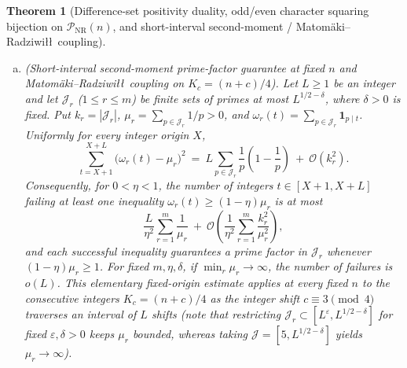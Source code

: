\documentclass[11pt, a4paper]{article}
\theoremstyle{plain}
\newtheorem{theorem}{Theorem}[section]
\theoremstyle{definition}
\begin{document}
\begin{theorem}[Difference-set positivity duality, odd/even character squaring bijection on $\mathcal{P}_{\mathrm{NR}}(n)$, and short-interval second-moment / Matom\"{a}ki--Radziwi\l\l\ coupling]
\begin{enumerate}[(a)]
\begin{equation}
\begin{split}
    \big|\widehat{\mu}_p(\psi^{2})\big|^{2}\ &=\ \prod_{q\mid K_p}\cos^{2}\!\big(\arg\psi(q)\big).
    \end{split}
    \end{equation}
    In particular, every Bohr-localized odd character $\chi\in\widehat{G}_p^{-}\setminus\{\psi_0\}$ in the extremal polarization cone $\chi(q)=e^{i\delta_q}$ ($|\delta_q|\ll k^{-1/2}$, $x_q(\chi)=1-\frac14\delta_q^{2}+\mathcal{O}(\delta_q^{4})$) maps bijectively under $\chi\mapsto\chi^{2}$ to an even character $\chi^{2}\in\widehat{G}_p^{+}\setminus\{\chi_0\}$ satisfying as $\max_{q\mid K_p}|\delta_q|\to 0$ the asymptotic \emph{Quartic Dilation Law}
    \begin{equation}\label{eq:quartic_dilation_law}
    \big|\widehat{\mu}_p(\chi^{2})\big|^{2}\ =\ \prod_{q\mid K_p}\big(2x_q(\chi)-1\big)^{2}\ =\ \exp\!\left(-\sum_{q\mid K_p}\delta_q^{2}+\mathcal{O}\Big(\sum_{q\mid K_p}\delta_q^{4}\Big)\right)\ =\ \Big(\big|\widehat{\mu}_p(\chi)\big|^{2}\Big)^{4+o(1)},
    \end{equation}
    isolating the curvature ratio $4$ at $\delta_q=0$ ($\cos^{2}(\delta_q)\approx 1-\delta_q^{2}$ versus $\cos^{2}(\delta_q/2)\approx 1-\frac14\delta_q^{2}$) as the sole local gap between $1$-to-$1$ Frobenius squaring and pointwise term-by-term positivity.

    \item \emph{(Short-interval second-moment prime-factor guarantee at fixed $n$ and Matom\"{a}ki--Radziwi\l\l\ coupling on $K_c=(n+c)/4$).} Let $L\ge1$ be an integer and let $\mathcal{J}_r$ ($1\le r\le m$) be finite sets of primes at most $L^{1/2-\delta}$, where $\delta>0$ is fixed. Put $k_r=|\mathcal{J}_r|$, $\mu_r=\sum_{p\in\mathcal{J}_r}1/p>0$, and $\omega_r(t)=\sum_{p\in\mathcal{J}_r}\mathbf{1}_{p\mid t}$. Uniformly for every integer origin $X$,
    \[
    \sum_{t=X+1}^{X+L}\big(\omega_r(t)-\mu_r\big)^{2}\ =\ L\sum_{p\in\mathcal{J}_r}\frac{1}{p}\left(1-\frac{1}{p}\right)\ +\ \mathcal{O}(k_r^{2}).
    \]
    Consequently, for $0<\eta<1$, the number of integers $t\in[X+1,X+L]$ failing at least one inequality $\omega_r(t)\ge(1-\eta)\mu_r$ is at most
    \[
    \frac{L}{\eta^{2}}\sum_{r=1}^{m}\frac{1}{\mu_r}\ +\ \mathcal{O}\!\left(\frac{1}{\eta^{2}}\sum_{r=1}^{m}\frac{k_r^{2}}{\mu_r^{2}}\right),
    \]
    and each successful inequality guarantees a prime factor in $\mathcal{J}_r$ whenever $(1-\eta)\mu_r\ge1$. For fixed $m,\eta,\delta$, if $\min_r\mu_r\to\infty$, the number of failures is $o(L)$. This elementary fixed-origin estimate applies at every fixed $n$ to the consecutive integers $K_c=(n+c)/4$ as the integer shift $c\equiv3\pmod 4$ traverses an interval of $L$ shifts (note that restricting $\mathcal{J}_r\subset[L^{\varepsilon},L^{1/2-\delta}]$ for fixed $\varepsilon,\delta>0$ keeps $\mu_r$ bounded, whereas taking $\mathcal{J}=[5,L^{1/2-\delta}]$ yields $\mu_r\to\infty$).


\end{enumerate}
\end{theorem}
\end{document}
